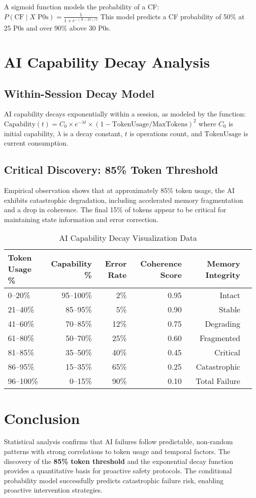 \documentclass[12pt]{article}
\begin{document}
A sigmoid function models the probability of a CF:
$P(\text{CF} \mid X \text{ P0s}) = \frac{1}{1 + e^{-(X - 25)/5}}$
This model predicts a CF probability of 50\% at 25 P0s and over 90\% above 30 P0s.

\section{AI Capability Decay Analysis}
\subsection{Within-Session Decay Model}
AI capability decays exponentially within a session, as modeled by the function:
$\text{Capability}(t) = C_0 \times e^{-\lambda t} \times (1 - \text{TokenUsage}/\text{MaxTokens})^2$
where $C_0$ is initial capability, $\lambda$ is a decay constant, $t$ is operations count, and $\text{TokenUsage}$ is current consumption.

\subsection{Critical Discovery: 85\% Token Threshold}
Empirical observation shows that at approximately 85\% token usage, the AI exhibits catastrophic degradation, including accelerated memory fragmentation and a drop in coherence. The final 15\% of tokens appear to be critical for maintaining state information and error correction.

\begin{table}[h!]
    \centering
    \begin{tabular}{lrrrrr}
    \toprule
    \textbf{Token Usage \%} & \textbf{Capability \%} & \textbf{Error Rate} & \textbf{Coherence Score} & \textbf{Memory Integrity} \\
    \midrule
    0--20\% & 95--100\% & 2\% & 0.95 & Intact \\
    21--40\% & 85--95\% & 5\% & 0.90 & Stable \\
    41--60\% & 70--85\% & 12\% & 0.75 & Degrading \\
    61--80\% & 50--70\% & 25\% & 0.60 & Fragmented \\
    81--85\% & 35--50\% & 40\% & 0.45 & Critical \\
    86--95\% & 15--35\% & 65\% & 0.25 & Catastrophic \\
    96--100\% & 0--15\% & 90\% & 0.10 & Total Failure \\
    \bottomrule
    \end{tabular}
    \caption{AI Capability Decay Visualization Data}
    \label{tab:decay-data}
\end{table}

\section{Conclusion}
Statistical analysis confirms that AI failures follow predictable, non-random patterns with strong correlations to token usage and temporal factors. The discovery of the \textbf{85\% token threshold} and the exponential decay function provides a quantitative basis for proactive safety protocols. The conditional probability model successfully predicts catastrophic failure risk, enabling proactive intervention strategies.
\end{document}
